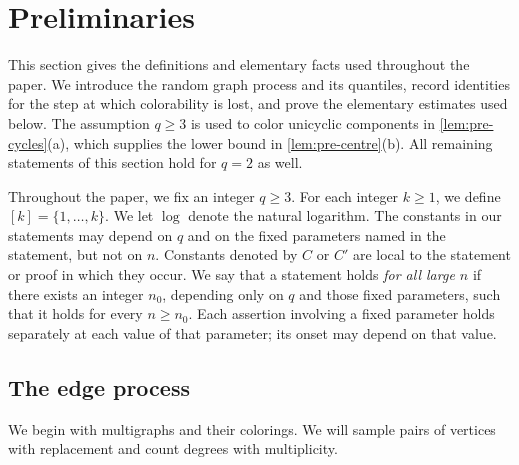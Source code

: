 \chapter{Preliminaries}\label{sec:pre}

This section gives the definitions and elementary facts used throughout the paper. We introduce the random graph process and its quantiles, record identities for the step at which colorability is lost, and prove the elementary estimates used below. The assumption $q \ge 3$ is used to color unicyclic components in \cref{lem:pre-cycles}(a), which supplies the lower bound in \cref{lem:pre-centre}(b). All remaining statements of this section hold for $q = 2$ as well.

Throughout the paper, we fix an integer $q \ge 3$. For each integer $k \ge 1$, we define $[k] = \{1, \dots, k\}$. We let $\log$ denote the natural logarithm. The constants in our statements may depend on $q$ and on the fixed parameters named in the statement, but not on $n$. Constants denoted by $C$ or $C'$ are local to the statement or proof in which they occur. We say that a statement holds \emph{for all large $n$} if there exists an integer $n_0$, depending only on $q$ and those fixed parameters, such that it holds for every $n \ge n_0$. Each assertion involving a fixed parameter holds separately at each value of that parameter; its onset may depend on that value.

\section{The edge process}\label{sec:pre-process}

We begin with multigraphs and their colorings. We will sample pairs of vertices with replacement and count degrees with multiplicity.

